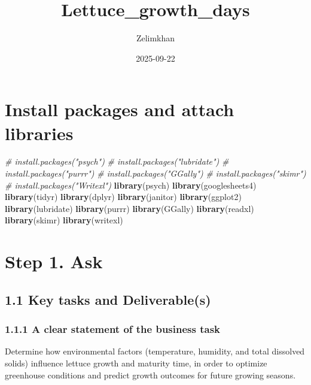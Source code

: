 \documentclass[
]{article}
\title{Lettuce\_growth\_days}
\author{Zelimkhan}
\date{2025-09-22}
\newenvironment{Shaded}{\begin{snugshade}}{\end{snugshade}}
\newcommand{\CommentTok}[1]{\textcolor[rgb]{0.56,0.35,0.01}{\textit{#1}}}
\newcommand{\FunctionTok}[1]{\textcolor[rgb]{0.13,0.29,0.53}{\textbf{#1}}}
\newcommand{\NormalTok}[1]{#1}
\begin{document}
\maketitle

{
\setcounter{tocdepth}{5}
\tableofcontents
}
\section{Install packages and attach
libraries}\label{install-packages-and-attach-libraries}

\begin{Shaded}
\begin{Highlighting}[]
\CommentTok{\# install.packages("psych")}
\CommentTok{\# install.packages("lubridate")}
\CommentTok{\# install.packages("purrr")}
\CommentTok{\# install.packages("GGally")}
\CommentTok{\# install.packages("skimr")}
\CommentTok{\# install.packages("Writexl")}
\FunctionTok{library}\NormalTok{(psych)}
\FunctionTok{library}\NormalTok{(googlesheets4)}
\FunctionTok{library}\NormalTok{(tidyr)}
\FunctionTok{library}\NormalTok{(dplyr)}
\FunctionTok{library}\NormalTok{(janitor)}
\FunctionTok{library}\NormalTok{(ggplot2)}
\FunctionTok{library}\NormalTok{(lubridate)}
\FunctionTok{library}\NormalTok{(purrr)}
\FunctionTok{library}\NormalTok{(GGally)}
\FunctionTok{library}\NormalTok{(readxl)}
\FunctionTok{library}\NormalTok{(skimr)}
\FunctionTok{library}\NormalTok{(writexl)}
\end{Highlighting}
\end{Shaded}

\section{Step 1. Ask}\label{step-1.-ask}

\subsection{1.1 Key tasks and
Deliverable(s)}\label{key-tasks-and-deliverables}

\subsubsection{1.1.1 A clear statement of the business
task}\label{a-clear-statement-of-the-business-task}

Determine how environmental factors (temperature, humidity, and total
dissolved solids) influence lettuce growth and maturity time, in order
to optimize greenhouse conditions and predict growth outcomes for future
growing seasons.
\end{document}
